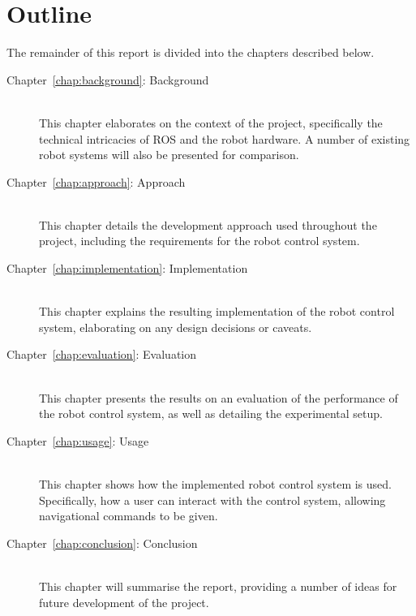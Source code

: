 \section{Outline}

The remainder of this report is divided into the chapters described below.

\begin{description}
	\item[Chapter~\ref{chap:background}: Background] \hfill \\
	This chapter elaborates on the context of the project, specifically the technical intricacies of ROS and the robot hardware. A number of existing robot systems will also be presented for comparison.

	\item[Chapter~\ref{chap:approach}: Approach] \hfill \\
	This chapter details the development approach used throughout the project, including the requirements for the robot control system.

	\item[Chapter~\ref{chap:implementation}: Implementation] \hfill \\
	This chapter explains the resulting implementation of the robot control system, elaborating on any design decisions or caveats.

	\item[Chapter~\ref{chap:evaluation}: Evaluation] \hfill \\
	This chapter presents the results on an evaluation of the performance of the robot control system, as well as detailing the experimental setup.

	\item[Chapter~\ref{chap:usage}: Usage] \hfill \\
	This chapter shows how the implemented robot control system is used. Specifically, how a user can interact with the control system, allowing navigational commands to be given.

	\item[Chapter~\ref{chap:conclusion}: Conclusion] \hfill \\
	This chapter will summarise the report, providing a number of ideas for future development of the project.
\end{description}